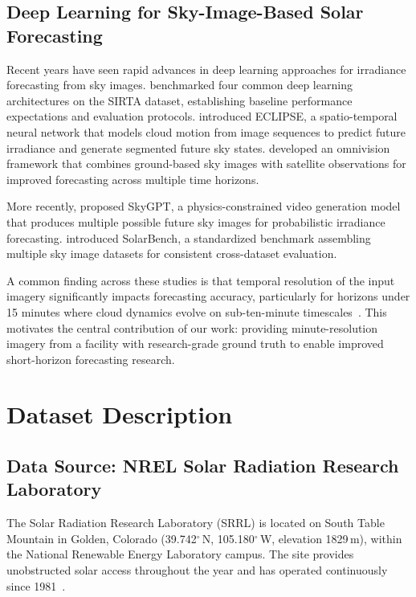 \documentclass[twoside,11pt]{article}
\begin{document}
\subsection{Deep Learning for Sky-Image-Based Solar Forecasting}

Recent years have seen rapid advances in deep learning approaches for irradiance forecasting from sky images. \citet{paletta2021benchmarking} benchmarked four common deep learning architectures on the SIRTA dataset, establishing baseline performance expectations and evaluation protocols. \citet{paletta2022eclipse} introduced ECLIPSE, a spatio-temporal neural network that models cloud motion from image sequences to predict future irradiance and generate segmented future sky states. \citet{paletta2023omnivision} developed an omnivision framework that combines ground-based sky images with satellite observations for improved forecasting across multiple time horizons.

More recently, \citet{nie2024skygpt} proposed SkyGPT, a physics-constrained video generation model that produces multiple possible future sky images for probabilistic irradiance forecasting. \citet{paletta2024solarbench} introduced SolarBench, a standardized benchmark assembling multiple sky image datasets for consistent cross-dataset evaluation.

A common finding across these studies is that temporal resolution of the input imagery significantly impacts forecasting accuracy, particularly for horizons under 15 minutes where cloud dynamics evolve on sub-ten-minute timescales~\citep{siddiqui2019deep, yang2022review}. This motivates the central contribution of our work: providing minute-resolution imagery from a facility with research-grade ground truth to enable improved short-horizon forecasting research.

\section{Dataset Description}
\label{sec:dataset}

\subsection{Data Source: NREL Solar Radiation Research Laboratory}

The Solar Radiation Research Laboratory (SRRL) is located on South Table Mountain in Golden, Colorado (39.742$^\circ$\,N, 105.180$^\circ$\,W, elevation 1829\,m), within the National Renewable Energy Laboratory campus. The site provides unobstructed solar access throughout the year and has operated continuously since 1981~\citep{nrel_srrl_bms}.
\end{document}
